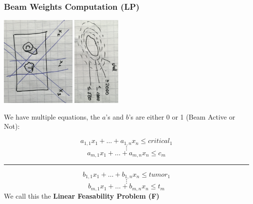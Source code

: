 \documentclass{exerciseBlue}
\begin{document}
\subsubsection{Beam Weights Computation (LP)}
\begin{center}
	\includegraphics[height = 4.5cm]{Images/LP}
	\includegraphics[height = 4.5cm]{Images/TumorTissue}
\end{center}
We have multiple equations, the $a$'s and $b$'s are either 0 or 1 (Beam Active or Not):

$$a_{1,1}x_1 + \dots + a_{1,n}x_n \leq critical_1$$
$$\vdots$$
$$a_{m,1}x_1 + \dots + a_{m,n}x_n \leq c_m$$
\noindent\rule{\textwidth}{0.3pt}
$$b_{1,1}x_1 + \dots + b_{1,n}x_n \leq tumor_1$$
$$\vdots$$
$$b_{m,1}x_1 + \dots + b_{m,n}x_n \leq t_m$$
We call this the \textbf{Linear Feasability Problem (F)}
\end{document}
